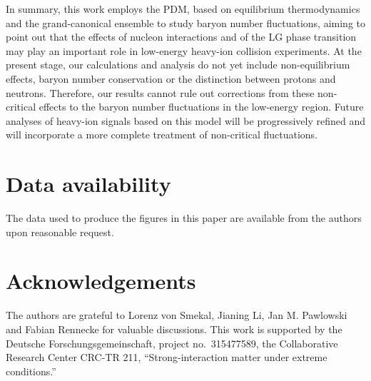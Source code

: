 \documentclass[aps,twocolumn,prd,superscriptaddress,nofootinbib,floatfix]{revtex4-2}
\begin{document}
In summary, this work employs the PDM, based on equilibrium thermodynamics and the grand-canonical ensemble to study baryon number fluctuations, aiming to point out that the effects of nucleon interactions and of the LG phase transition may play an important role in low-energy heavy-ion collision experiments. At the present stage, our calculations and analysis do not yet include non-equilibrium effects, baryon number conservation or the distinction between protons and neutrons. Therefore, our results cannot rule out corrections from these non-critical effects to the baryon number fluctuations in the low-energy region. Future analyses of heavy-ion signals based on this model will be progressively refined and will incorporate a more complete treatment of non-critical fluctuations.

\section{Data availability}
The data used to produce the figures in this paper are available from the authors upon reasonable request.
\section*{Acknowledgements}

The authors are grateful to Lorenz von Smekal, Jianing Li, Jan M. Pawlowski and Fabian Rennecke for valuable discussions. 
This work is supported by the Deutsche Forschungsgemeinschaft, project no.~315477589, the Collaborative Research Center CRC-TR 211, ``Strong-interaction matter under
extreme conditions.'' 

\appendix 
{}   
\end{document}

